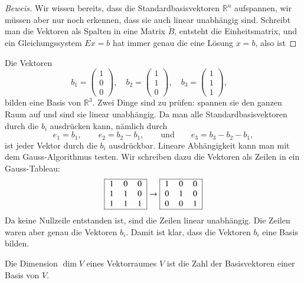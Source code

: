 \begin{proof}[Beweis]
Wir wissen bereits, dass die Standardbasisvektoren $\mathbb R^n$ aufspannen,
wir müssen aber nur noch erkennen, dass sie auch linear unabhängig sind.
Schreibt man die Vektoren als Spalten in eine Matrix $\tilde B$, entsteht die
Einheitsmatrix, und ein Gleichungssystem $Ex=b$ hat immer genau die eine
Lösung $x=b$, also ist 
\end{proof}

\begin{beispiel}
Die Vektoren 
\[
b_1=\begin{pmatrix}1\\0\\0\end{pmatrix},\quad
b_2=\begin{pmatrix}1\\1\\0\end{pmatrix},\quad
b_3=\begin{pmatrix}1\\1\\1\end{pmatrix},\quad
\]
bilden eine Basis von $\mathbb R^3$.
Zwei Dinge sind zu prüfen:
spannen sie den ganzen Raum auf und sind sie linear unabhängig.
Da man alle Standardbasisvektoren durch die $b_i$ ausdrücken kann, nämlich
durch
\[
e_1=b_1,\qquad e_2=b_2-b_1,\qquad\text{und}\qquad e_3=b_3-b_2-b_1,
\]
ist jeder Vektor durch die $b_i$ ausdrückbar.
Lineare Abhängigkeit kann
man mit dem Gauss-Algorithmus testen.
Wir schreiben dazu die Vektoren
als Zeilen in ein Gauss-Tableau:
\[
\begin{tabular}{|>{$}c<{$}>{$}c<{$}>{$}c<{$}|}
\hline
1&0&0\\
1&1&0\\
1&1&1\\
\hline
\end{tabular}
\rightarrow
\begin{tabular}{|>{$}c<{$}>{$}c<{$}>{$}c<{$}|}
\hline
1&0&0\\
0&1&0\\
0&0&1\\
\hline
\end{tabular}
\]
Da keine Nullzeile entstanden ist, sind die Zeilen linear unabhängig.
Die Zeilen waren aber genau die Vektoren $b_i$.
Damit ist klar, dass
die Vektoren $b_i$ eine Basis bilden.
\end{beispiel}

\begin{definition}
Die Dimension $\dim V$ eines Vektorraumes $V$ ist die Zahl der
Basisvektoren einer Basis von $V$.
\end{definition}

